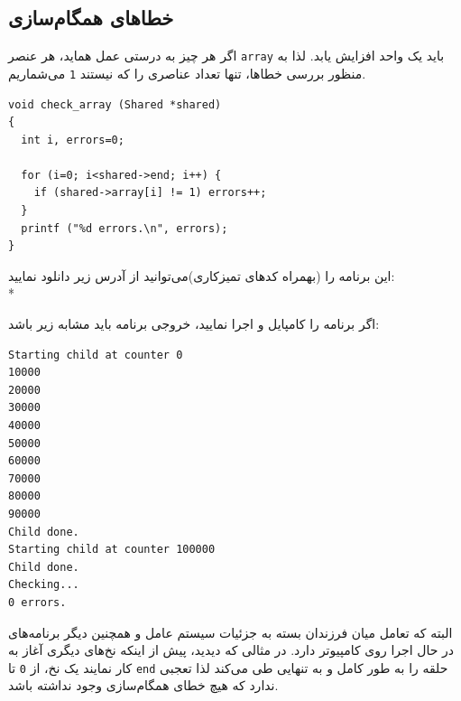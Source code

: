 \documentclass{book}
\begin{document}
\subsection{خطاهای همگام‌سازی}

    اگر هر چیز به درستی عمل هماید، هر عنصر {\tt array} باید یک واحد افزایش یابد. 
    لذا به منظور بررسی خطاها، تنها تعداد عناصری را که نیستند {\tt 1} می‌شماریم.

\begin{latin}
\begin{lstlisting}
void check_array (Shared *shared)
{
  int i, errors=0;

  for (i=0; i<shared->end; i++) {
    if (shared->array[i] != 1) errors++;
  }
  printf ("%d errors.\n", errors);
}
\end{lstlisting}
\end{latin}

    این برنامه را (بهمراه کدهای تمیزکاری)می‌توانید از آدرس زیر دانلود نمایید: \\*    

    اگر برنامه را کامپایل و اجرا نمایید، خروجی برنامه باید مشابه زیر باشد: 

\begingroup
\setLTR
\begin{verbatim}
Starting child at counter 0
10000
20000
30000
40000
50000
60000
70000
80000
90000
Child done.
Starting child at counter 100000
Child done.
Checking...
0 errors.
\end{verbatim}
\endgroup

    البته که تعامل میان فرزندان بسته به جزئیات سیستم عامل و همچنین دیگر برنامه‌های در حال اجرا روی کامپیوتر دارد. 
    در مثالی که دیدید، پیش از اینکه نخ‌های دیگری آغاز به کار نمایند یک نخ، از {\tt 0} تا  {\tt end} حلقه را به طور کامل و به تنهایی طی می‌کند
    لذا تعجبی ندارد که هیچ خطای همگام‌سازی وجود نداشته باشد. 
\end{document}
